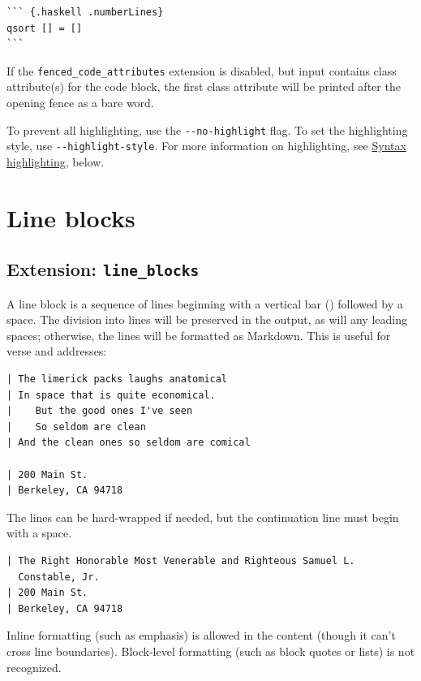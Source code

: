 \documentclass[
  b5paper
]{book}
\begin{document}
\begin{verbatim}
``` {.haskell .numberLines}
qsort [] = []
```
\end{verbatim}

If the \texttt{fenced\_code\_attributes} extension is disabled, but
input contains class attribute(s) for the code block, the first class
attribute will be printed after the opening fence as a bare word.

To prevent all highlighting, use the \texttt{-\/-no-highlight} flag. To
set the highlighting style, use \texttt{-\/-highlight-style}. For more
information on highlighting, see \hyperref[syntax-highlighting]{Syntax
highlighting}, below.

\section{Line blocks}\label{line-blocks}

\subsection{\texorpdfstring{Extension:
\texttt{line\_blocks}}{Extension: line\_blocks}}\label{extension-line_blocks}

A line block is a sequence of lines beginning with a vertical bar
(\texttt{\textbar{}}) followed by a space. The division into lines will
be preserved in the output, as will any leading spaces; otherwise, the
lines will be formatted as Markdown. This is useful for verse and
addresses:

\begin{verbatim}
| The limerick packs laughs anatomical
| In space that is quite economical.
|    But the good ones I've seen
|    So seldom are clean
| And the clean ones so seldom are comical

| 200 Main St.
| Berkeley, CA 94718
\end{verbatim}

The lines can be hard-wrapped if needed, but the continuation line must
begin with a space.

\begin{verbatim}
| The Right Honorable Most Venerable and Righteous Samuel L.
  Constable, Jr.
| 200 Main St.
| Berkeley, CA 94718
\end{verbatim}

Inline formatting (such as emphasis) is allowed in the content (though
it can't cross line boundaries). Block-level formatting (such as block
quotes or lists) is not recognized.
\end{document}
